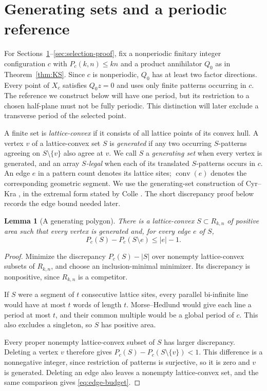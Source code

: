 \documentclass[11pt]{article}
\numberwithin{equation}{section}
\newtheorem{lemma}[theorem]{Lemma}
\theoremstyle{definition}
\theoremstyle{remark}
\newcommand{\conv}{\operatorname{conv}}
\newcommand{\Rect}{R_{k,n}}
\begin{document}
\section{Generating sets and a periodic reference}\label{sec:selection-inputs}
For Sections~\ref{sec:selection-inputs}--\ref{sec:selection-proof}, fix a nonperiodic finitary
integer configuration $c$ with $P_c(k,n)\le kn$ and a product annihilator $Q_0$ as in
Theorem~\ref{thm:KS}. Since $c$ is nonperiodic, $Q_0$ has at least two factor directions.
Every point of $X_c$ satisfies $Q_0z=0$ and uses only finite patterns occurring in $c$. The reference we construct below will have one period, but its restriction to a chosen
half-plane must not be fully periodic. This distinction will later exclude a transverse period of
the selected point.

A finite set is \emph{lattice-convex} if it consists of all lattice points of its convex hull. A
vertex $v$ of a lattice-convex set $S$ is \emph{generated} if any two occurring $S$-patterns
agreeing on $S\setminus\{v\}$ also agree at $v$. We call $S$ a \emph{generating set} when every
vertex is generated, and an array \emph{$S$-legal} when each of its translated $S$-patterns occurs
in $c$. An edge $e$ in a pattern count denotes its lattice sites; $\conv(e)$ denotes the
corresponding geometric segment. We use the generating-set construction of Cyr--Kra
\cite[Lemmas~2.5 and~2.8]{CK}, in the extremal form stated by Colle \cite[Section~2]{Colle}.
The short discrepancy proof below records the edge bound needed later.

\begin{lemma}[A generating polygon]\label{lem:generating}
There is a lattice-convex $S\subset\Rect$ of positive area such that every vertex is generated and,
for every edge $e$ of $S$,
\begin{equation}\label{eq:edge-budget}
 P_c(S)-P_c(S\setminus e)\le |e|-1.
\end{equation}
\end{lemma}
\begin{proof}
Minimize the discrepancy $P_c(S)-|S|$ over nonempty lattice-convex subsets of $\Rect$, and choose an
inclusion-minimal minimizer. Its discrepancy is nonpositive, since $\Rect$ is a competitor.

If $S$ were a segment of $t$ consecutive lattice sites, every parallel bi-infinite line would have
at most $t$ words of length $t$. Morse--Hedlund would give each line a period at most $t$, and their
common multiple would be a global period of $c$. This also excludes a singleton, so $S$ has positive
area.

Every proper nonempty lattice-convex subset of $S$ has larger discrepancy. Deleting a vertex $v$
therefore gives $P_c(S)-P_c(S\setminus\{v\})<1$. This difference is a nonnegative integer, since
restriction of patterns is surjective, so it is zero and $v$ is generated. Deleting an edge also
leaves a nonempty lattice-convex set, and the same comparison gives \eqref{eq:edge-budget}.
\end{proof}
\end{document}

